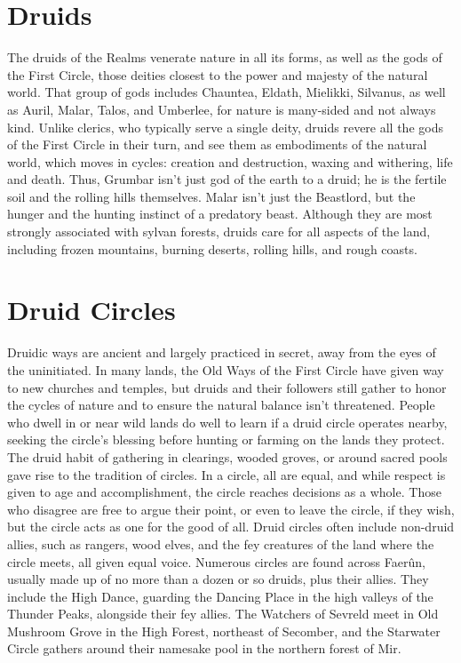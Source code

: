 \documentclass[10pt,a4paper,twoside,twocolumn,openany,bg=print,nodeprecatedcode]{dndbook}
\begin{document}
\section{Druids}
The druids of the Realms venerate nature in all its forms, as well as the gods of the First Circle, those deities closest to the power and majesty of the natural world. That group of gods includes Chauntea, Eldath, Mielikki, Silvanus, as well as Auril, Malar, Talos, and Umberlee, for nature is many-sided and not always kind.
Unlike clerics, who typically serve a single deity, druids revere all the gods of the First Circle in their turn, and see them as embodiments of the natural world, which moves in cycles: creation and destruction, waxing and withering, life and death. Thus, Grumbar isn't just god of the earth to a druid; he is the fertile soil and the rolling hills themselves. Malar isn't just the Beastlord, but the hunger and the hunting instinct of a predatory beast.
Although they are most strongly associated with sylvan forests, druids care for all aspects of the land, including frozen mountains, burning deserts, rolling hills, and rough coasts.
\section{Druid Circles}
Druidic ways are ancient and largely practiced in secret, away from the eyes of the uninitiated. In many lands, the Old Ways of the First Circle have given way to new churches and temples, but druids and their followers still gather to honor the cycles of nature and to ensure the natural balance isn't threatened. People who dwell in or near wild lands do well to learn if a druid circle operates nearby, seeking the circle's blessing before hunting or farming on the lands they protect.
The druid habit of gathering in clearings, wooded groves, or around sacred pools gave rise to the tradition of circles. In a circle, all are equal, and while respect is given to age and accomplishment, the circle reaches decisions as a whole. Those who disagree are free to argue their point, or even to leave the circle, if they wish, but the circle acts as one for the good of all. Druid circles often include non-druid allies, such as rangers, wood elves, and the fey creatures of the land where the circle meets, all given equal voice.
Numerous circles are found across Faerûn, usually made up of no more than a dozen or so druids, plus their allies. They include the High Dance, guarding the Dancing Place in the high valleys of the Thunder Peaks, alongside their fey allies. The Watchers of Sevreld meet in Old Mushroom Grove in the High Forest, northeast of Secomber, and the Starwater Circle gathers around their namesake pool in the northern forest of Mir.
\end{document}
